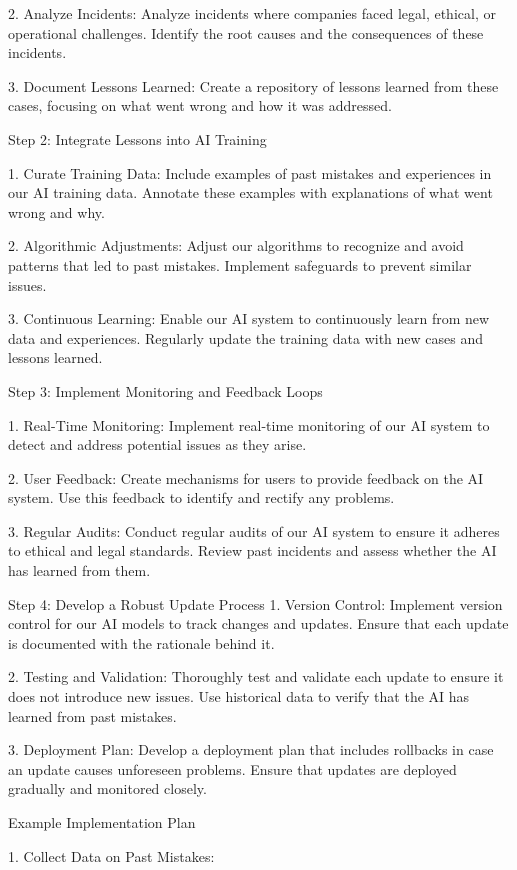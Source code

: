 \documentclass[12pt,letterpaper]{article}
\begin{document}
2. Analyze Incidents: Analyze incidents where companies faced legal, ethical, or operational challenges. Identify the root causes and the consequences of these incidents.

3. Document Lessons Learned: Create a repository of lessons learned from these cases, focusing on what went wrong and how it was addressed.

 

Step 2: Integrate Lessons into AI Training

1. Curate Training Data: Include examples of past mistakes and experiences in our AI training data. Annotate these examples with explanations of what went wrong and why.

2. Algorithmic Adjustments: Adjust our algorithms to recognize and avoid patterns that led to past mistakes. Implement safeguards to prevent similar issues.

3. Continuous Learning: Enable our AI system to continuously learn from new data and experiences. Regularly update the training data with new cases and lessons learned.

 Step 3: Implement Monitoring and Feedback Loops

1. Real-Time Monitoring: Implement real-time monitoring of our AI system to detect and address potential issues as they arise.

2. User Feedback: Create mechanisms for users to provide feedback on the AI system. Use this feedback to identify and rectify any problems.

3. Regular Audits: Conduct regular audits of our AI system to ensure it adheres to ethical and legal standards. Review past incidents and assess whether the AI has learned from them.

 Step 4: Develop a Robust Update Process
1. Version Control: Implement version control for our AI models to track changes and updates. Ensure that each update is documented with the rationale behind it.

2. Testing and Validation: Thoroughly test and validate each update to ensure it does not introduce new issues. Use historical data to verify that the AI has learned from past mistakes.

3. Deployment Plan: Develop a deployment plan that includes rollbacks in case an update causes unforeseen problems. Ensure that updates are deployed gradually and monitored closely.

 Example Implementation Plan

1. Collect Data on Past Mistakes:
\end{document}
